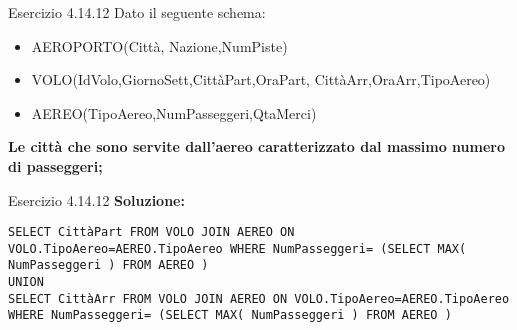 %
\begin{frame}{Esercizio 4.14.12}
    Dato il seguente schema:
    \begin{itemize}
        \item AEROPORTO(Citt\`a, Nazione,NumPiste)
        \item VOLO(IdVolo,GiornoSett,Citt\`aPart,OraPart,
        Citt\`aArr,OraArr,TipoAereo)
        \item AEREO(TipoAereo,NumPasseggeri,QtaMerci)
    \end{itemize}
    \vspace{1em}
    
    \textbf{Le citt\`a che sono servite dall'aereo caratterizzato dal massimo numero di passeggeri;}
\end{frame}
\begin{frame}{Esercizio 4.14.12}
    \textbf{Soluzione:}
    \vspace{1em}
    
    \texttt{SELECT Citt\`aPart FROM VOLO JOIN AEREO ON VOLO.TipoAereo=AEREO.TipoAereo WHERE NumPasseggeri=      (SELECT MAX( NumPasseggeri ) FROM AEREO )
    \\ UNION
    \\ SELECT Citt\`aArr FROM VOLO JOIN AEREO ON VOLO.TipoAereo=AEREO.TipoAereo WHERE NumPasseggeri=      (SELECT MAX( NumPasseggeri ) FROM AEREO )}
\end{frame}
